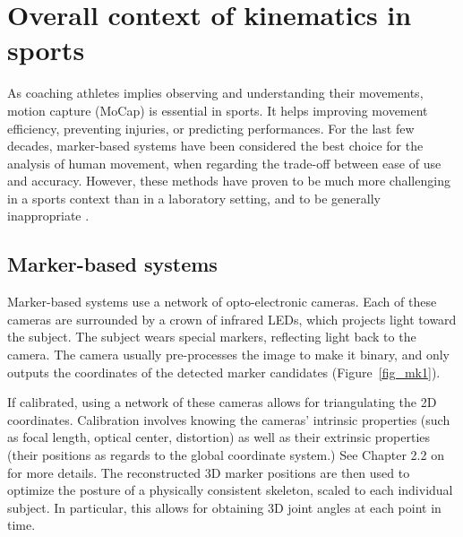 \minitoc
\newpage



\section{Overall context of kinematics in sports}

As coaching athletes implies observing and understanding their movements, motion capture (MoCap) is essential in sports. It helps improving movement efficiency, preventing injuries, or predicting performances. For the last few decades, marker-based systems have been considered the best choice for the analysis of human movement, when regarding the trade-off between ease of use and accuracy. However, these methods have proven to be much more challenging in a sports context than in a laboratory setting, and to be generally inappropriate \cite{Mündermann2006}.

\subsection{Marker-based systems}

Marker-based systems use a network of opto-electronic cameras. Each of these cameras are surrounded by a crown of infrared LEDs, which projects light toward the subject. The subject wears special markers, reflecting light back to the camera. The camera usually pre-processes the image to make it binary, and only outputs the coordinates of the detected marker candidates (Figure~\ref{fig_mk1}). 

If calibrated, using a network of these cameras allows for triangulating the 2D coordinates. Calibration involves knowing the cameras' intrinsic properties (such as focal length, optical center, distortion) as well as their extrinsic properties (their positions as regards to the global coordinate system.) See Chapter 2.2 on  for more details. The reconstructed 3D marker positions are then used to optimize the posture of a physically consistent skeleton, scaled to each individual subject. In particular, this allows for obtaining 3D joint angles at each point in time.

